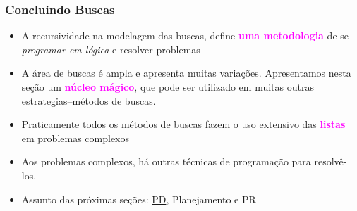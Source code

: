 \begin{frame}[fragile]
\frametitle{Concluindo Buscas}

\begin{block}{}
\begin{itemize}
  
  
  \item A recursividade na modelagem das buscas, 
  define \textcolor{magenta}{\textbf{uma metodologia}} de
   se \textit{programar em lógica} e resolver problemas
 
 
  \pause
  \item A área de buscas é ampla e apresenta muitas variações. Apresentamos
  nesta seção um \textcolor{magenta}{\textbf{núcleo mágico}}, que pode ser utilizado em muitas outras
  estrategias--métodos de buscas. 
  
  
  \pause
  \item Praticamente todos os métodos de buscas fazem o uso extensivo das 
  \textcolor{magenta}{\textbf{listas}} em problemas complexos
  
  \pause
  \item Aos problemas complexos, há outras técnicas de programação
  para resolvê-los.
    
  \pause
  \item Assunto das próximas seções: \underline{PD}, Planejamento e PR
\end{itemize}

\end{block}

\end{frame}
